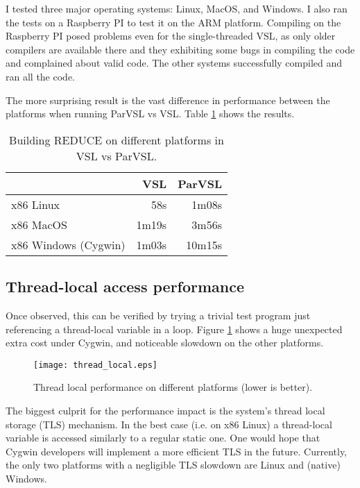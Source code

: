 I tested three major operating systems: Linux, MacOS, and Windows. I also
ran the tests on a Raspberry PI to test it on the ARM platform. Compiling on the Raspberry PI
posed problems even for the single-threaded VSL, as only older compilers are available
there and they exhibiting some bugs in compiling the code and complained about valid code.
The other systems successfully compiled and ran all the code.

The more surprising result is the vast difference in performance between the platforms
when running ParVSL vs VSL. Table \ref{table:cross-platform-reduce} shows the results.

\begin{table}[H]
  \centering
  \begin{tabular}{lrr}
                       & VSL    & ParVSL \\
  \hline
  x86 Linux            &   58s &  1m08s \\
  x86 MacOS            & 1m19s &  3m56s  \\
  x86 Windows (Cygwin) & 1m03s & 10m15s \\
  \end{tabular}
  \caption{Building REDUCE on different platforms in VSL vs ParVSL.}
  \label{table:cross-platform-reduce}
\end{table}

\subsection{Thread-local access performance}

Once observed, this can be verified by trying a trivial test program just referencing a
thread-local variable in a loop. Figure \ref{fig:threadlocal}
shows a huge unexpected extra cost under Cygwin, and noticeable slowdown on the other platforms.

\begin{figure}[H]
\centering
\texttt{[image: thread\_local.eps]}
\caption{Thread local performance on different platforms (lower is better).}
\label{fig:threadlocal}
\end{figure}

The biggest culprit for the performance impact is the system's thread local storage (TLS)
mechanism. In the best case (i.e. on x86 Linux) a thread-local variable is accessed
similarly to a regular static one. One would hope that Cygwin developers will
implement a more efficient TLS in the future. Currently, the only two platforms
with a negligible TLS slowdown are Linux and (native) Windows.